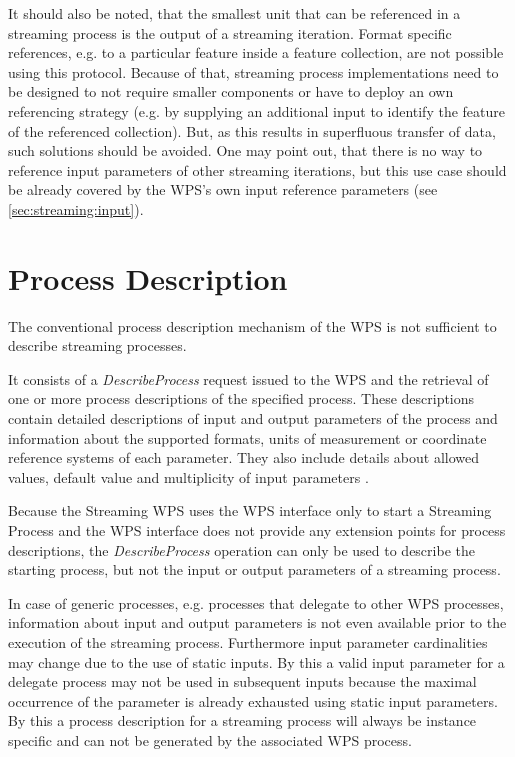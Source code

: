   It should also be noted, that the smallest unit that can be referenced in a streaming process is the output of a streaming iteration. Format specific references, e.g. to a particular feature inside a feature collection, are not possible using this protocol. Because of that, streaming process implementations need to be designed to not require smaller components or have to deploy an own referencing strategy (e.g. by supplying an additional input to identify the feature of the referenced collection). But, as this results in superfluous transfer of data, such solutions should be avoided. One may point out, that there is no way to reference input parameters of other streaming iterations, but this use case should be already covered by the \ac{WPS}'s own input reference parameters (see \cref{sec:streaming:input}).

\section{Process Description} %
  \label{sec:stream:processdescription}
  The conventional process description mechanism of the \ac{WPS} is not sufficient to describe streaming processes.

  It consists of a \emph{DescribeProcess} request issued to the \ac{WPS} and the retrieval of one or more process descriptions of the specified process. These descriptions contain detailed descriptions of input and output parameters of the process and information about the supported formats, units of measurement or coordinate reference systems of each parameter. They also include details about allowed values, default value and multiplicity of input parameters \citep{ogc:wps}.

  Because the Streaming \ac{WPS} uses the \ac{WPS} interface only to start a Streaming Process and the \ac{WPS} interface does not provide any extension points for process descriptions, the \emph{DescribeProcess} operation can only be used to describe the starting process, but not the input or output parameters of a streaming process.

  In case of generic processes, e.g. processes that delegate to other \ac{WPS} processes, information about input and output parameters is not even available prior to the execution of the streaming process. Furthermore input parameter cardinalities may change due to the use of static inputs. By this a valid input parameter for a delegate process may not be used in subsequent inputs because the maximal occurrence of the parameter is already exhausted using static input parameters. By this a process description for a streaming process will always be instance specific and can not be generated by the associated \ac{WPS} process.

